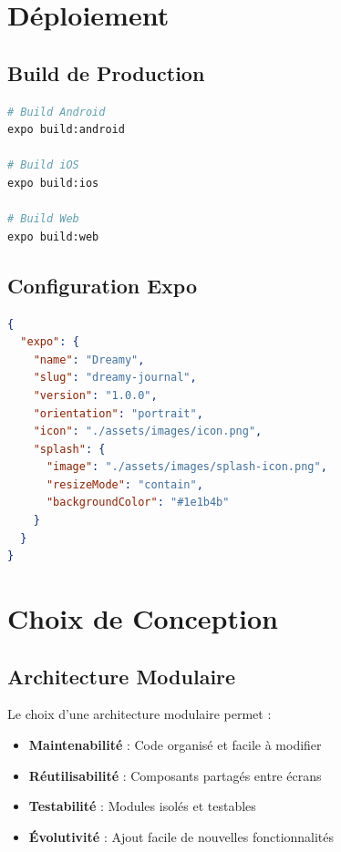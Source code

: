 \documentclass[12pt,a4paper]{article}
\begin{document}
\section{Déploiement}

\subsection{Build de Production}

\begin{lstlisting}[language=bash, caption=Commandes de build]
# Build Android
expo build:android

# Build iOS
expo build:ios

# Build Web
expo build:web
\end{lstlisting}

\subsection{Configuration Expo}

\begin{lstlisting}[language=json, caption=Configuration app.json]
{
  "expo": {
    "name": "Dreamy",
    "slug": "dreamy-journal",
    "version": "1.0.0",
    "orientation": "portrait",
    "icon": "./assets/images/icon.png",
    "splash": {
      "image": "./assets/images/splash-icon.png",
      "resizeMode": "contain",
      "backgroundColor": "#1e1b4b"
    }
  }
}
\end{lstlisting}

\section{Choix de Conception}

\subsection{Architecture Modulaire}

Le choix d'une architecture modulaire permet :

\begin{itemize}
    \item \textbf{Maintenabilité} : Code organisé et facile à modifier
    \item \textbf{Réutilisabilité} : Composants partagés entre écrans
    \item \textbf{Testabilité} : Modules isolés et testables
    \item \textbf{Évolutivité} : Ajout facile de nouvelles fonctionnalités
\end{itemize}
\end{document}
